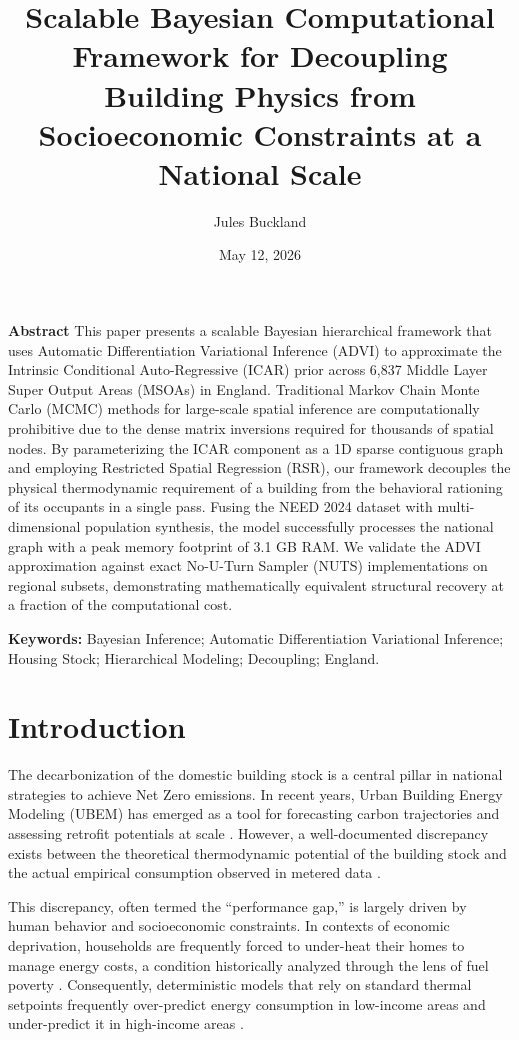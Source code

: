 \documentclass[11pt, a4paper, twocolumn]{article}
\title{Scalable Bayesian Computational Framework for Decoupling Building Physics from Socioeconomic Constraints at a National Scale}
\author{Jules Buckland}
\date{May 12, 2026}
\begin{document}
\maketitle

\textbf{Abstract} This paper presents a scalable Bayesian hierarchical framework that uses Automatic Differentiation Variational Inference (ADVI) to approximate the Intrinsic Conditional Auto-Regressive (ICAR) prior across 6,837 Middle Layer Super Output Areas (MSOAs) in England. Traditional Markov Chain Monte Carlo (MCMC) methods for large-scale spatial inference are computationally prohibitive due to the dense matrix inversions required for thousands of spatial nodes. By parameterizing the ICAR component as a 1D sparse contiguous graph and employing Restricted Spatial Regression (RSR), our framework decouples the physical thermodynamic requirement of a building from the behavioral rationing of its occupants in a single pass. Fusing the NEED 2024 dataset with multi-dimensional population synthesis, the model successfully processes the national graph with a peak memory footprint of 3.1 GB RAM. We validate the ADVI approximation against exact No-U-Turn Sampler (NUTS) implementations on regional subsets, demonstrating mathematically equivalent structural recovery at a fraction of the computational cost.

\textbf{Keywords:} Bayesian Inference; Automatic Differentiation Variational Inference; Housing Stock; Hierarchical Modeling; Decoupling; England.

\section{Introduction}\label{introduction}

The decarbonization of the domestic building stock is a central pillar in national strategies to achieve Net Zero emissions. In recent years, Urban Building Energy Modeling (UBEM) has emerged as a tool for forecasting carbon trajectories and assessing retrofit potentials at scale \cite{Chen2017, Reinhart2016}. However, a well-documented discrepancy exists between the theoretical thermodynamic potential of the building stock and the actual empirical consumption observed in metered data \cite{Hong2009, Lutzenhiser2009}. 

This discrepancy, often termed the ``performance gap,'' is largely driven by human behavior and socioeconomic constraints. In contexts of economic deprivation, households are frequently forced to under-heat their homes to manage energy costs, a condition historically analyzed through the lens of fuel poverty \cite{Boardman1991, Hills2012}. Consequently, deterministic models that rely on standard thermal setpoints frequently over-predict energy consumption in low-income areas and under-predict it in high-income areas \cite{Ward2019}. 
\end{document}

